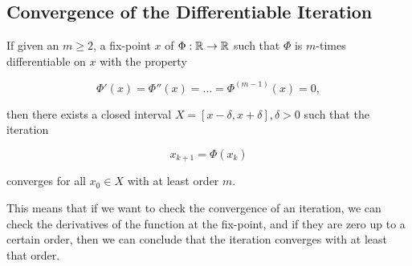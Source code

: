 \subsection{Convergence of the Differentiable Iteration}

If given an \(m \ge 2\), a fix-point \(x\) of \(\Phi: \mathbb{R} \to \mathbb{R}\) such that \(\Phi\) is \(m\)-times differentiable on \(x\) with the 
property 

\[
    \Phi'(x) = \Phi''(x) = \dots = \Phi^{(m - 1)}(x) = 0,
\]

then there exists a closed interval \(X = [x - \delta, x + \delta], \delta > 0\) such that the iteration 

\[
    x_{k + 1} = \Phi(x_k)
\]

converges for all \(x_0 \in X\) with at least order \(m\).

This means that if we want to check the convergence of an iteration, we can check the derivatives of the function at the fix-point, and if they are zero up to a certain order, then 
we can conclude that the iteration converges with at least that order.




